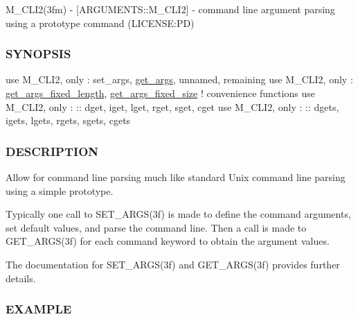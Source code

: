 M\+\_\+\+C\+L\+I2(3fm) -\/ \mbox{[}A\+R\+G\+U\+M\+E\+N\+T\+S\+::\+M\+\_\+\+C\+L\+I2\mbox{]} -\/ command line argument parsing using a prototype command (L\+I\+C\+E\+N\+SE\+:PD) \subsubsection*{S\+Y\+N\+O\+P\+S\+IS}

use M\+\_\+\+C\+L\+I2, only \+: set\+\_\+args, \mbox{\hyperlink{interfacem__cli2_1_1get__args}{get\+\_\+args}}, unnamed, remaining use M\+\_\+\+C\+L\+I2, only \+: \mbox{\hyperlink{interfacem__cli2_1_1get__args__fixed__length}{get\+\_\+args\+\_\+fixed\+\_\+length}}, \mbox{\hyperlink{interfacem__cli2_1_1get__args__fixed__size}{get\+\_\+args\+\_\+fixed\+\_\+size}} ! convenience functions use M\+\_\+\+C\+L\+I2, only \+: \+:\+: dget, iget, lget, rget, sget, cget use M\+\_\+\+C\+L\+I2, only \+: \+:\+: dgets, igets, lgets, rgets, sgets, cgets

\subsubsection*{D\+E\+S\+C\+R\+I\+P\+T\+I\+ON}

Allow for command line parsing much like standard Unix command line parsing using a simple prototype.

Typically one call to S\+E\+T\+\_\+\+A\+R\+G\+S(3f) is made to define the command arguments, set default values, and parse the command line. Then a call is made to G\+E\+T\+\_\+\+A\+R\+G\+S(3f) for each command keyword to obtain the argument values.

The documentation for S\+E\+T\+\_\+\+A\+R\+G\+S(3f) and G\+E\+T\+\_\+\+A\+R\+G\+S(3f) provides further details.

\subsubsection*{E\+X\+A\+M\+P\+LE}

